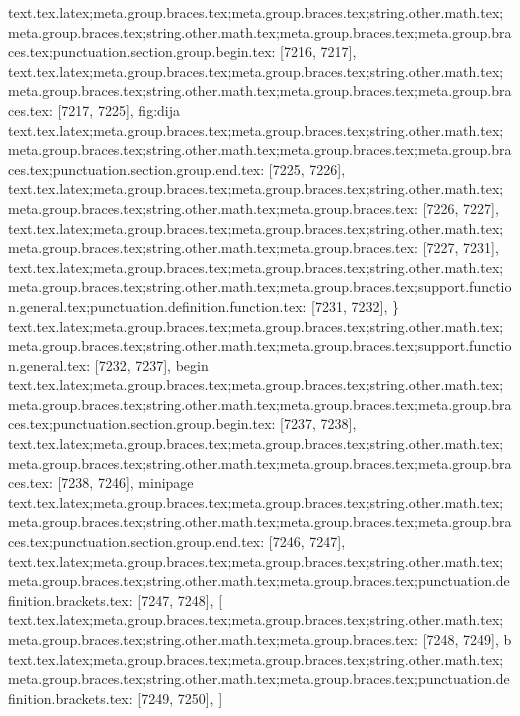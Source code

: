 {{{{{{{{{{{{{{{{{{{{{{{{{{{{{{{{{{{{{{{{{{{{{{{{{{{{{{{{{{{{{{{{{{{{{{{{{{{{{{{{{{{{{{{{{{{{{{{{{{{{{{{{{{{{{{{{{{{{{{{{{{{{{{{{{{{{{{{{{{{{{{{{{{{{{{{{{{{{{{{{{{{{{{{{{{{{{{{{{{{{{{{{{{{{{{{text.tex.latex;meta.group.braces.tex;meta.group.braces.tex;string.other.math.tex;meta.group.braces.tex;string.other.math.tex;meta.group.braces.tex;meta.group.braces.tex;punctuation.section.group.begin.tex: [7216, 7217], {{}
text.tex.latex;meta.group.braces.tex;meta.group.braces.tex;string.other.math.tex;meta.group.braces.tex;string.other.math.tex;meta.group.braces.tex;meta.group.braces.tex: [7217, 7225], {fig:dija}
text.tex.latex;meta.group.braces.tex;meta.group.braces.tex;string.other.math.tex;meta.group.braces.tex;string.other.math.tex;meta.group.braces.tex;meta.group.braces.tex;punctuation.section.group.end.tex: [7225, 7226], {}}
text.tex.latex;meta.group.braces.tex;meta.group.braces.tex;string.other.math.tex;meta.group.braces.tex;string.other.math.tex;meta.group.braces.tex: [7226, 7227], {
}
text.tex.latex;meta.group.braces.tex;meta.group.braces.tex;string.other.math.tex;meta.group.braces.tex;string.other.math.tex;meta.group.braces.tex: [7227, 7231], {    }
text.tex.latex;meta.group.braces.tex;meta.group.braces.tex;string.other.math.tex;meta.group.braces.tex;string.other.math.tex;meta.group.braces.tex;support.function.general.tex;punctuation.definition.function.tex: [7231, 7232], {\}
text.tex.latex;meta.group.braces.tex;meta.group.braces.tex;string.other.math.tex;meta.group.braces.tex;string.other.math.tex;meta.group.braces.tex;support.function.general.tex: [7232, 7237], {begin}
text.tex.latex;meta.group.braces.tex;meta.group.braces.tex;string.other.math.tex;meta.group.braces.tex;string.other.math.tex;meta.group.braces.tex;meta.group.braces.tex;punctuation.section.group.begin.tex: [7237, 7238], {{}
text.tex.latex;meta.group.braces.tex;meta.group.braces.tex;string.other.math.tex;meta.group.braces.tex;string.other.math.tex;meta.group.braces.tex;meta.group.braces.tex: [7238, 7246], {minipage}
text.tex.latex;meta.group.braces.tex;meta.group.braces.tex;string.other.math.tex;meta.group.braces.tex;string.other.math.tex;meta.group.braces.tex;meta.group.braces.tex;punctuation.section.group.end.tex: [7246, 7247], {}}
text.tex.latex;meta.group.braces.tex;meta.group.braces.tex;string.other.math.tex;meta.group.braces.tex;string.other.math.tex;meta.group.braces.tex;punctuation.definition.brackets.tex: [7247, 7248], {[}
text.tex.latex;meta.group.braces.tex;meta.group.braces.tex;string.other.math.tex;meta.group.braces.tex;string.other.math.tex;meta.group.braces.tex: [7248, 7249], {b}
text.tex.latex;meta.group.braces.tex;meta.group.braces.tex;string.other.math.tex;meta.group.braces.tex;string.other.math.tex;meta.group.braces.tex;punctuation.definition.brackets.tex: [7249, 7250], {]}
}}}}}}}}}}}}}}}}}}}}}}}}}}}}}}}}}}}}}}}}}}}}}}}}}}}}}}}}}}}}}}}}}}}}}}}}}}}}}}}}}}}}}}}}}}}}}}}}}}}}}}}}}}}}}}}}}}}}}}}}}}}}}}}}}}}}}}}}}}}}}}}}}}}}}}}}}}}}}}}}}}}}}}}}}}}}}}}}}}}}}}}}}}}}}}}}
